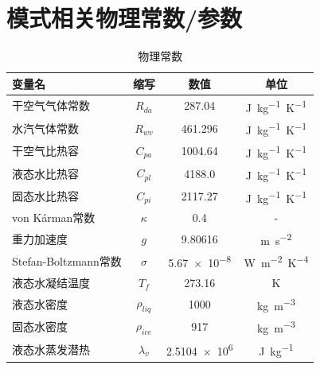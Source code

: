 \chapter{模式相关物理常数/参数}\label{模式相关物理常数参数}

\begin{table}[htbp]
\centering
\caption{物理常数}
\label{tab:物理常数}
\begin{tabular}{lccc}
\toprule
变量名&缩写&数值&单位 \\\midrule
干空气气体常数            & $R_{da}$                      & \num{287.04}     & \unit{J.kg^{-1}.K^{-1}}  \\ 
水汽气体常数             & $R_{wv}$                       & \num{461.296}     & \unit{J.kg^{-1}.K^{-1}}  \\
干空气比热容             & $C_{pa} $                      & \num{1004.64}    & \unit{J.kg^{-1}.K^{-1}}  \\
液态水比热容             & $C_{pl}$                       & \num{4188.0}     & \unit{J.kg^{-1}.K^{-1}}  \\
固态水比热容             & $C_{pi}$                       & \num{2117.27}    & \unit{J.kg^{-1}.K^{-1}}  \\
von K\'arman常数       & $\kappa$                        & \num{0.4}        &    -     \\
重力加速度              & $g$                             & \num{9.80616}    & \unit{m.s^{-2}}    \\
Stefan-Boltzmann常数 & $\sigma$                          & \num{5.67e-8}    & \unit{W.m^{-2}.K^{-4}} \\
液态水凝结温度            & $T_f$                         & \num{273.16}     & K       \\
液态水密度              & $\rho_{liq}$                   & \num{1000}        & \unit{kg.m^{-3}}   \\
固态水密度              & $\rho_{ice}$                   & \num{917}         & \unit{kg.m^{-3}}   \\
液态水蒸发潜热            & $\lambda_v$                  & \num{2.5104e6}    & \unit{J.kg^{-1}}    \\

\end{tabular}
\end{table}
